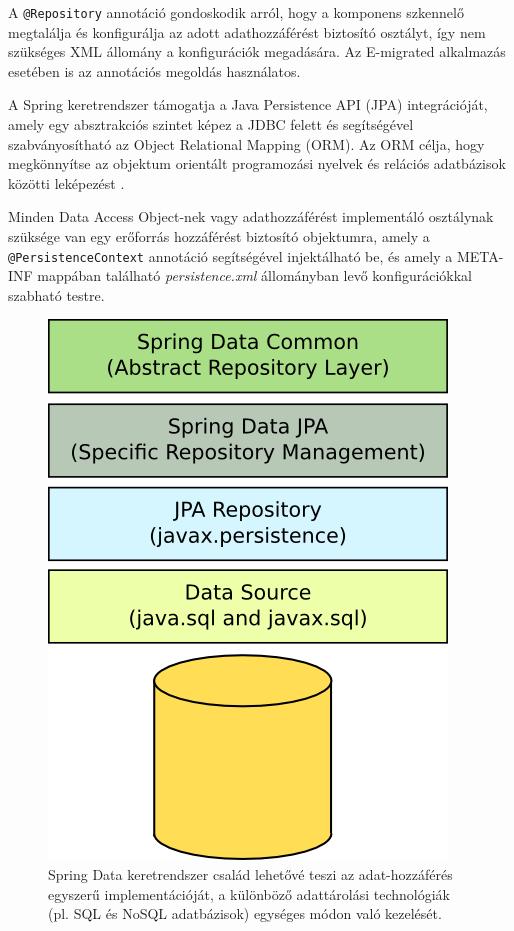 \begin{reviewed}
A \texttt{@Repository} annotáció gondoskodik arról, hogy a komponens szkennelő megtalálja és konfigurálja az adott adathozzáférést biztosító osztályt, így nem szükséges XML állomány a konfigurációk megadására. Az E-migrated alkalmazás esetében is az annotációs megoldás használatos.

A Spring keretrendszer támogatja  a Java Persistence API (JPA) integrációját, amely egy absztrakciós szintet képez a JDBC felett és segítségével szabványosítható az Object Relational Mapping (ORM).  Az ORM célja, hogy megkönnyítse az objektum orientált programozási nyelvek és relációs adatbázisok közötti leképezést \cite{DataAccess}.

Minden Data Access Object-nek vagy adathozzáférést implementáló osztálynak szüksége van egy erőforrás hozzáférést biztosító objektumra, amely a \texttt{@PersistenceContext} annotáció segítségével injektálható be, és amely a META-INF mappában található \textit{persistence.xml} állományban levő konfigurációkkal szabható testre.


 \begin{figure}
  \centering
  \includegraphics[height=0.5\linewidth]{images/SpringDataJPA}
  \caption{ \protect\footnotemark Spring Data keretrendszer család  lehetővé teszi az adat-hozzáférés egyszerű implementációját, a különböző adattárolási technológiák (pl. SQL és NoSQL adatbázisok) egységes módon való kezelését.}
  \label{fig:SpringDataJPA}
\end{figure}


\end{reviewed}
